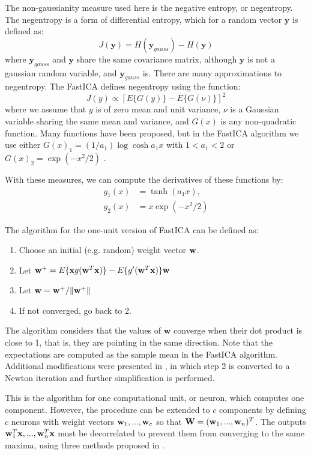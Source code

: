 The non-gaussianity measure used here is the negative entropy, or negentropy. The negentropy is a form of differential entropy, which for a random vector $\mathbf{y}$ is defined as: 
\begin{equation}
J(\mathbf{y})=H(\mathbf{y}_{gauss})-H(\mathbf{y})
\end{equation}
where  $\mathbf{y}_{gauss}$ and $\mathbf{y}$ share the same covariance matrix, although $\mathbf{y}$ is not a gaussian random variable, and $\mathbf{y}_{gauss}$ is. There are many approximations to negentropy. The FastICA defines negentropy using the function: 
\begin{equation}
J(y)\propto [E\{G(y)\}-E\{G(\nu)\}]^2
\end{equation}
where we assume that $y$ is of zero mean and unit variance, $\nu$ is a Gaussian variable sharing the same mean and variance, and $G(x)$ is any non-quadratic function. Many functions have been proposed, but in the FastICA algorithm we use either $G(x)_1 = (1/a_1) \log\cosh a_1 x$ with $1<a_1<2$ or $G(x)_2 = \exp(-x^2/2)$ \cite{FastICA99}. 

With these measures, we can compute the derivatives of these functions by: 
\begin{align}
g_1(x) & =\tanh(a_1 x), \\
g_2(x) & = x\exp(- x^2/2)
\end{align} 

The algorithm for the one-unit version of FastICA can be defined \cite{FastICA99} as:
\begin{enumerate}
	\item Choose an initial (e.g. random) weight vector ${\bf w}$.
	\item Let  ${\bf w}^+=E\{{\bf x}g({\bf w}^T{\bf x})\}-E\{g'({\bf w}^T{\bf x})\}{\bf w}$
	\item Let  ${\bf w}={\bf w}^+/\Vert{\bf w}^+\Vert$
	\item If not converged, go back to 2.
\end{enumerate}

The algorithm considers that the values of $\mathbf{w}$ converge when their dot product is close to 1, that is, they are pointing in the same direction. Note that the expectations are computed as the sample mean in the FastICA algorithm. Additional modifications were presented in \cite{Hyvarinen2000}, in which step 2 is converted to a Newton iteration and further simplification is performed. 

This is the algorithm for one computational unit, or neuron, which computes one component. However, the procedure can be extended to $c$ components by defining $c$ neurons with weight vectors ${\bf w}_1,...,{\bf w}_c$ so that $\mathbf{W} = ({\bf w}_1,...,{\bf w}_n)^T$. The outputs ${\bf w}_1^T{\bf x},...,{\bf w}_n^T{\bf x}$ must be decorrelated to prevent them from converging to the same maxima, using three methods proposed in \cite{Hyvarinen2000}. 

